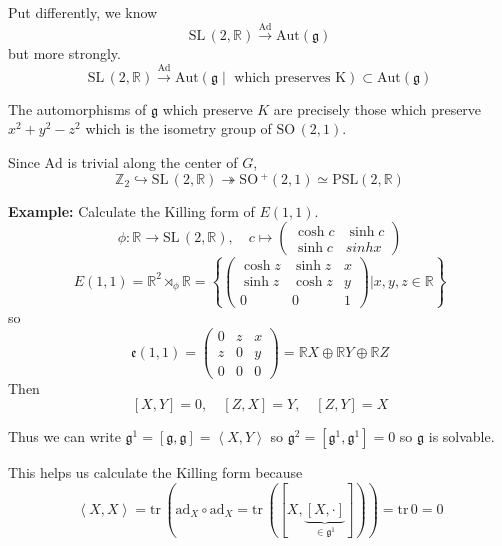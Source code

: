 \documentclass[12pt]{article}
\newcommand{\R}{\mathbb{R}}
\newcommand{\Z}{\mathbb{Z}}
\newcommand{\brak}[1]{\left\langle #1 \right\rangle}
\newcommand{\SL}{\text{SL}\,}
\newcommand{\SO}{\text{SO}\,}
\newcommand{\tr}{\text{tr}\,}
\newcommand{\g}{\mathfrak{g}}
\newcommand{\Ad}{\text{Ad}}
\newcommand{\ad}{\text{ad}}
\begin{document}
    Put differently, we know 
    \[\SL(2, \R) \overset{\Ad}{\longrightarrow} \text{Aut}(\g)\]
    but more strongly. 
    \[\SL(2, \R) \overset{\Ad}{\longrightarrow} \text{Aut}(\g \; | \; \text{ which preserves K}) \subset \text{Aut}(\g)\] 

    The automorphisms of $\g$ which preserve $K$ are precisely those which preserve $x^2 + y^2 - z^2$ which is the isometry group of $\SO(2, 1)$.


    Since $\Ad$ is trivial along the center of $G$,
    \[\Z_2 \hookrightarrow \SL(2, \R) \twoheadrightarrow \SO^+(2, 1) \simeq \text{PSL}(2,\R)\]

    \textbf{Example:} Calculate the Killing form of $E(1, 1)$. 
    \[\phi: \R \to \SL(2, \R), \quad c \mapsto \begin{pmatrix}
        \cosh c  & \sinh c\\
        \sinh c & sinh x
    \end{pmatrix}\]
    \[E(1, 1) = \R^2 \rtimes_{\phi} \R = \left\{\begin{pmatrix}
        \cosh z & \sinh z & x\\ 
        \sinh z & \cosh z & y\\
        0 & 0 & 1
    \end{pmatrix} \bigg\vert x, y, z \in \R\right\}\]
    so 
    \[\mathfrak{e}(1, 1) = \begin{pmatrix}
        0 & z & x\\ 
        z & 0 & y\\
        0 & 0 & 0
    \end{pmatrix} = \R X \oplus \R Y \oplus \R Z\]
    Then 
    \[[X, Y] = 0, \quad [Z, X] = Y, \quad [Z, Y] = X\]

    Thus we can write $\g^1 = [\g, \g] = \brak{X, Y}$ so $\g^2 = [\g^1, \g^1] = 0$ so $\g$ is solvable. 

    This helps us calculate the Killing form because 
    \[\brak{X, X} = \tr(\ad_X \circ \ad_X = \tr([X, \underbrace{[X, \cdot]}_{\in \g^1}])) = \tr 0 = 0\]
    
\end{document}
